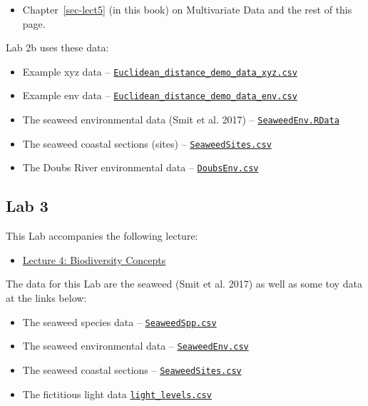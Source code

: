 \documentclass[
  10pt,
]{book}
\providecommand{\tightlist}{%
  \setlength{\itemsep}{0pt}\setlength{\parskip}{0pt}}
\let\oldtexttt\texttt
\renewcommand{\texttt}[1]{\oldtexttt{\small #1}}
\begin{document}
\begin{itemize}
\tightlist
\item
  Chapter~\ref{sec-lect5} (in this book) on Multivariate Data and the
  rest of this page.
\end{itemize}

Lab 2b uses these data:

\begin{itemize}
\tightlist
\item
  Example xyz data --
  \href{../data/Euclidean_distance_demo_data_xyz.csv}{\texttt{Euclidean\_distance\_demo\_data\_xyz.csv}}
\item
  Example env data --
  \href{../data/Euclidean_distance_demo_data_env.csv}{\texttt{Euclidean\_distance\_demo\_data\_env.csv}}
\item
  The seaweed environmental data (Smit et al. 2017) --
  \href{../data/seaweed/SeaweedEnv.RData}{\texttt{SeaweedEnv.RData}}
\item
  The seaweed coastal sections (sites) --
  \href{../data/seaweed/SeaweedSites.csv}{\texttt{SeaweedSites.csv}}
\item
  The Doubs River environmental data --
  \href{../data/DoubsEnv.csv}{\texttt{DoubsEnv.csv}}
\end{itemize}

\subsection{Lab 3}\label{lab-3}

This Lab accompanies the following lecture:

\begin{itemize}
\tightlist
\item
  \href{Lec-04-biodiversity.html}{Lecture 4: Biodiversity Concepts}
\end{itemize}

The data for this Lab are the seaweed (Smit et al. 2017) as well as some
toy data at the links below:

\begin{itemize}
\tightlist
\item
  The seaweed species data --
  \href{../data/seaweed/SeaweedSpp.csv}{\texttt{SeaweedSpp.csv}}
\item
  The seaweed environmental data --
  \href{../data/seaweed/SeaweedEnv.csv}{\texttt{SeaweedEnv.csv}}
\item
  The seaweed coastal sections --
  \href{../data/seaweed/SeaweedSites.csv}{\texttt{SeaweedSites.csv}}
\item
  The fictitious light data
  \href{../data/light_levels.csv}{\texttt{light\_levels.csv}}
\end{itemize}
\end{document}
